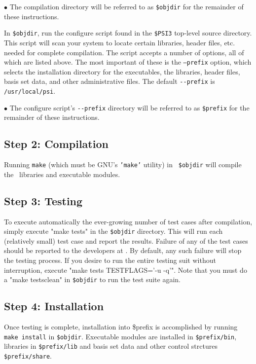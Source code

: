 \documentclass[12pt]{article}
\begin{document}
$\bullet$ The compilation directory will be referred to as {\tt \$objdir}
for the remainder of these instructions.

In {\tt \$objdir}, run the configure script found in the {\tt \$PSI3}
top-level source directory.  This script will scan your system to locate
certain libraries, header files, etc. needed for complete compilation.
The script accepts a number of options, all of which are listed above.
The most important of these is the {\tt --prefix} option, which selects the
installation directory for the executables, the libraries, header files,
basis set data, and other administrative files.  The default {\tt -}{\tt -prefix}
is {\tt /usr/local/psi}.

$\bullet$ The configure script's {\tt -}{\tt -prefix} directory will be referred
to as {\tt \$prefix} for the remainder of these instructions.

\subsection{Step 2: Compilation}

Running {\tt make} (which must be GNU's {\tt 'make'} utility) in {\tt
\$objdir} will compile the \PSIthree\ libraries and executable
modules.

\subsection{Step 3: Testing}

To execute automatically the ever-growing number of test cases after
compilation, simply execute "make tests" in the {\tt \$objdir}
directory.  This will run each (relatively small) test case and report
the results.  Failure of any of the test cases should be reported to
the developers at \PSIemail. By default, any such failure will stop
the testing process.  If you desire to run the entire testing suit
without interruption, execute "make tests TESTFLAGS='-u -q'". Note
that you must do a "make testsclean" in {\tt \$objdir} to run the test
suite again.

\subsection{Step 4: Installation}

Once testing is complete, installation into \$prefix is accomplished by
running {\tt make install} in {\tt \$objdir}.   Executable modules are
installed in {\tt \$prefix/bin}, libraries in {\tt \$prefix/lib} and basis 
set data and other control strctures {\tt \$prefix/share}.
\end{document}
